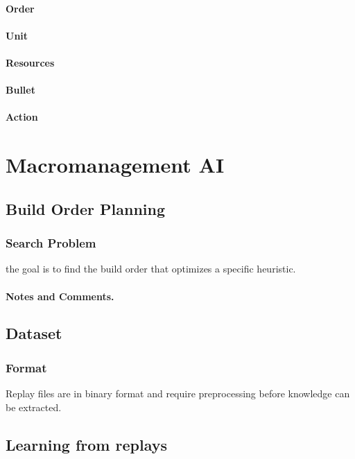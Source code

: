 \documentclass{llncs}
\begin{document}
\paragraph{Order}
\paragraph{Unit}
\paragraph{Resources}
\paragraph{Bullet}
\paragraph{Action}

\section{Macromanagement AI}
\subsection{Build Order Planning}
\subsubsection{Search Problem}
the goal is to find the build order that optimizes a specific heuristic.
\paragraph{Notes and Comments.}
\subsection{Dataset}
\subsubsection{Format}
Replay files are in binary format and require preprocessing before knowledge can be extracted.
\subsection{Learning from replays}

\subsection{}
\end{document}
